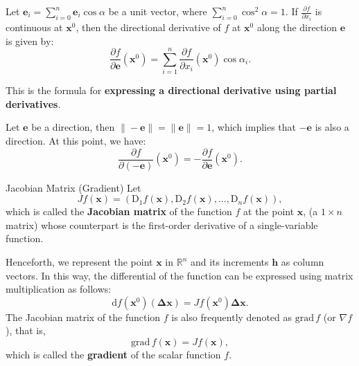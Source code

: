 \documentclass[11pt]{elegantbook}
\begin{document}
Let \(\mathbf{e}_{i}=\sum_{i=0}^{n} \mathbf{e}_{i}\cos\alpha\) be a unit vector, 
where \(\sum_{i=0}^{n} \cos^2\alpha = 1\).
If \(\frac{\partial f}{\partial x_{i}}\) is continuous at \(\mathbf{x}^0\), 
then the directional derivative of \(f\) at \(\mathbf{x}^0\) along the direction \(\mathbf{e}\) is given by:
\[
\frac{\partial f}{\partial \mathbf{e}}(\mathbf{x}^0) = \sum_{i=1}^n \frac{\partial f}{\partial x_i}(\mathbf{x}^0) \cos \alpha_i.
\]

This is the formula for \textbf{expressing a directional derivative using partial derivatives}.


\begin{note}
    Let \(\mathbf{e}\) be a direction, then \(\|-\mathbf{e}\| = \|\mathbf{e}\| = 1\), 
    which implies that \(-\mathbf{e}\) is also a direction. At this point, we have:
    \[
    \frac{\partial f}{\partial (-\mathbf{e})}(\mathbf{x}^{0}) = -\frac{\partial f}{\partial \mathbf{e}}(\mathbf{x}^{0}).
    \]
\end{note}



\begin{definition}{Jacobian Matrix (Gradient)}
    Let
    \[
    Jf(\mathbf{x}) = (\mathrm{D}_1 f(\mathbf{x}), \mathrm{D}_2 f(\mathbf{x}), \dots, \mathrm{D}_n f(\mathbf{x})),
    \]
    which is called the \textbf{Jacobian matrix} of the function \( f \) at the point \( \mathbf{x} \), 
    (a \( 1 \times n \) matrix) whose counterpart is the first-order derivative of a single-variable function.

    Henceforth, we represent the point \(\mathbf{x}\) in \( \mathbb{R}^n \) 
    and its increments \(\mathbf{h}\) as column vectors.
    In this way, the differential of the function can be expressed using matrix multiplication as follows:
    \[
    \mathrm{d}f(\mathbf{x}^{0})(\mathbf{\Delta x}) = Jf(\mathbf{x}^{0}) \mathbf{\Delta x}.
    \]
    The Jacobian matrix of the function \( f \) is also frequently denoted as 
    \(\mathrm{grad}\,f\) (or \(\nabla f\)), that is,
    \[
    \mathrm{grad}\,f(\mathbf{x}) = Jf(\mathbf{x}),
    \]
    which is called the \textbf{gradient} of the scalar function \( f \).
\end{definition}
\end{document}
